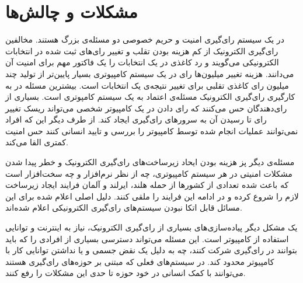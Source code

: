 \section{مشکلات و چالش‌ها}
\par
در یک سیستم رای‌گیری امنیت و حریم خصوصی دو مسئله‌ی بزرگ هستند. مخالفین رای‌گیری الکترونیک از کم هزینه بودن تقلب و تغییر رای‌های ثبت شده در انتخابات الکترونیکی می‌گویند و رد کاغذی در یک انتخابات را یک فاکتور مهم برای امنیت آن می‌دانند. هزینه تغییر میلیون‌ها رای در یک سیستم کامپیوتری بسیار پایین‌تر از تولید چند میلیون رای کاغذی تقلبی برای تغییر نتیجه‌ی یک انتخابات است.
بیشترین مسئله در به کارگیری رای‌گیری الکترونیک مسئله‌ی اعتماد به یک سیستم‌ کامپوتری است. بسیاری از رای‌دهندگان حس می‌کنند که رای دادن در یک کامپیوتر شخصی می‌تواند ریسک تغییر رای تا رسیدن آن به سرور‌های رای‌گیری ایجاد کند. از طرف دیگر این که افراد نمی‌توانند عملیات انجام شده توسط کامپیوتر را بررسی و تایید انسانی کنند حس امنیت کمتری القا می‌کند.
\par
مسئله‌ی دیگر پز هزینه بودن ایحاد زیرساخت‌های رای‌گیری الکترونیک و خطر پیدا شدن مشکلات امنیتی در هر سیستم کامپیوتری، چه از نظر نرم‌افزار و چه سخت‌افزار است که باعث شده تعدادی از کشور‌ها از حمله هلند، ایرلند و آلمان فرایند ایجاد زیرساخت لازم را شروع کرده و در ادامه این فرایند را ملقی کنند. دلیل اصلی اعلام شده برای این مسائل‌ قابل اتکا نبودن سیستم‌های رای‌گیری الکترونیکی اعلام شده‌اند. 
\par
یک مشکل دیگر پیاده‌سازی‌های بسیاری از رای‌گیری الکترونیک، نیاز به اینترنت و توانایی استفاده از کامپیوتر است. این مسئله می‌تواند دسترسی بسیاری از افرادی را که باید بتوانند در رای‌گیری شرکت کنند، چه به دلیل یک نقض جسمی و یا نداشتن توانایی کار با کامپیوتر محدود کند. در سیستم‌های فعلی که مبتنی بر حوزه‌های رای‌گیری هستند می‌توانند با کمک انسانی در خود حوزه تا حدی این مشکلات را رفع کنند. 
